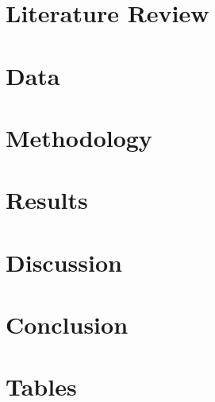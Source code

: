 \documentclass[12pt]{article}
\begin{document}
\section{Literature Review}
\label{sec:literature}

\section{Data}
\label{sec:data}

\section{Methodology}
\label{sec:method}

\section{Results}
\label{sec:results}

\section{Discussion}
\label{sec:discussion}

\section{Conclusion}
\label{sec:conclusion}


\clearpage
\singlespacing
\setlength{\bibsep}{0pt}


   


\clearpage
\onehalfspacing

\section*{Tables}

\end{document}

